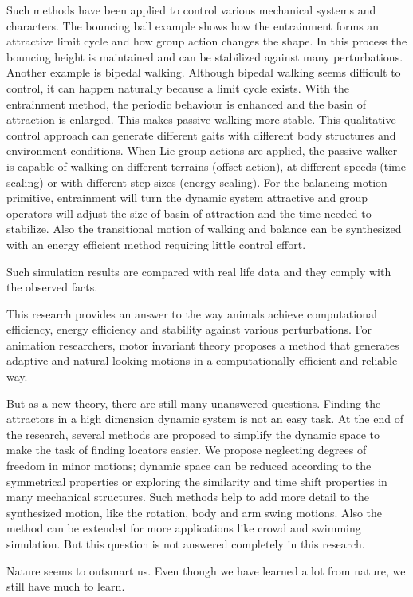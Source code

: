 Such methods have been applied to control various mechanical systems and characters. 
The bouncing ball example shows how the entrainment forms an attractive limit cycle and how group action changes the shape. 
In this process the bouncing height is maintained and can be stabilized against many perturbations. 
Another example is bipedal walking.  
Although bipedal walking seems difficult to control,  it can happen naturally because a limit cycle exists.
With the entrainment method, the periodic behaviour is enhanced and the basin of attraction is enlarged.  
This makes passive walking more stable. 
This qualitative control approach can generate different gaits with different body structures and environment conditions. 
When Lie group actions are applied, the passive walker is capable of walking on different terrains (offset action), at different speeds (time scaling) or with different step sizes (energy scaling). 
For the balancing motion primitive, entrainment will turn the dynamic system attractive and group operators will adjust the size of basin of attraction and the time needed to stabilize. 
Also the transitional motion of walking and balance can be synthesized with an energy efficient method requiring little control effort. 

Such simulation results are compared with real life data and they comply with the observed facts. 

This research provides an answer to the way animals achieve computational efficiency, energy efficiency and stability against various perturbations.
For animation researchers, motor invariant theory proposes a method that generates adaptive and natural looking motions in a computationally efficient and reliable way.

But as a new theory, there are still many unanswered questions. 
Finding the attractors in a high dimension dynamic system is not an easy task. 
At the end of the research, several methods are proposed to simplify the dynamic space to make the task of finding locators easier. 
We propose neglecting degrees of freedom in minor motions; dynamic space can be reduced according to the symmetrical properties or exploring the similarity and time shift properties in many mechanical structures. 
Such methods help to add more detail to the synthesized motion, like the rotation, body and arm swing motions. 
Also the method can be extended for more applications like crowd and swimming simulation. 
But this question is not answered completely in this research.

Nature seems to outsmart us. Even though we have learned a lot from nature,  we still have much to learn.



